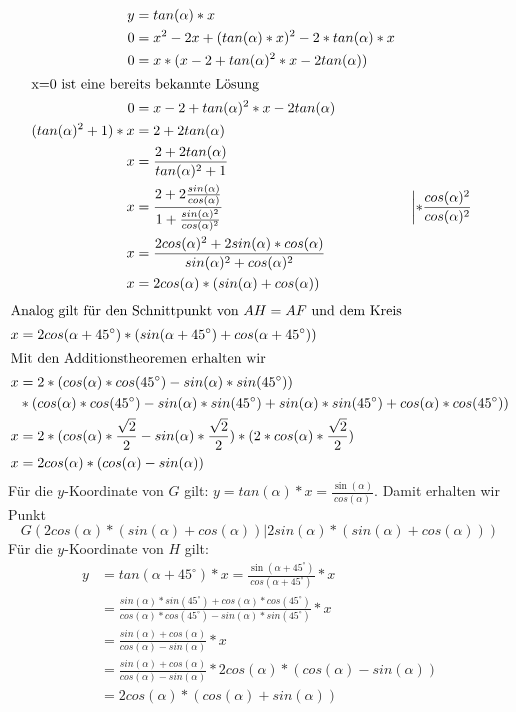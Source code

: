 \documentclass{article}
\numberwithin{equation}{section}
\begin{document}
	\begin{align*}
		y&=tan(\alpha)*x\\
		0&=x^2-2x+(tan(\alpha)*x)^2-2*tan(\alpha)*x\\
		0&=x*(x-2+tan(\alpha)^2*x-2tan(\alpha))\\
		\intertext{x=0 ist eine bereits bekannte Lösung}
		0&=x-2+tan(\alpha)^2*x-2tan(\alpha)\\
		(tan(\alpha)^2+1)*x&=2+2tan(\alpha)\\
		x&=\dfrac{2+2tan(\alpha)}{tan(\alpha)^2+1}\\
		x&=\dfrac{2+2\frac{sin(\alpha)}{cos(\alpha)}}{1+\frac{sin(\alpha)^2}{cos(\alpha)^2}}&&\left|*\frac{cos(\alpha)^2}{cos(\alpha)^2}\right.\\
		x&=\dfrac{2cos(\alpha)^2+2sin(\alpha)*cos(\alpha)}{sin(\alpha)^2+cos(\alpha)^2}\\
		x&=2cos(\alpha)*(sin(\alpha)+cos(\alpha))
	\end{align*}
	\begin{align*}
		\intertext{Analog gilt für den Schnittpunkt von $AH=AF$ und dem Kreis}
		x&=2cos(\alpha+45^{\circ})*(sin(\alpha+45^{\circ})+cos(\alpha+45^{\circ}))\\
		\intertext{Mit den Additionstheoremen erhalten wir}
		x&=2*(cos(\alpha)*cos(45^{\circ})-sin(\alpha)*sin(45^{\circ}))\\
		&*(cos(\alpha)*cos(45^{\circ})-sin(\alpha)*sin(45^{\circ})+sin(\alpha)*sin(45^{\circ})+cos(\alpha)*cos(45^{\circ}))\\
		x&=2*(cos(\alpha)*\frac{\sqrt{2}}{2}-sin(\alpha)*\frac{\sqrt{2}}{2})*(2*cos(\alpha)*\frac{\sqrt{2}}{2})\\
		x&=2cos(\alpha)*(cos(\alpha)-sin(\alpha))
	\end{align*}
	Für die $y$-Koordinate von $G$ gilt: $y = tan(\alpha)*x = \frac{\sin(\alpha)}{cos(\alpha)}$.
	Damit erhalten wir Punkt \[G\left(2cos(\alpha)*(sin(\alpha)+cos(\alpha))\left|2sin(\alpha)*(sin(\alpha)+cos(\alpha))\right.\right)\]
	Für die $y$-Koordinate von $H$ gilt:
	\begin{align*}
	y &= tan(\alpha+45^{\circ})*x = \frac{\sin(\alpha+45^{\circ})}{cos(\alpha+45^{\circ})}*x\\
	&= \frac{sin(\alpha)*sin(45^{\circ})+cos(\alpha)*cos(45^{\circ})}{cos(\alpha)*cos(45^{\circ})-sin(\alpha)*sin(45^{\circ})}*x\\ 
	&= \frac{sin(\alpha)+cos(\alpha)}{cos(\alpha)-sin(\alpha)}*x\\ 
	&= \frac{sin(\alpha)+cos(\alpha)}{cos(\alpha)-sin(\alpha)}*2cos(\alpha)*(cos(\alpha)-sin(\alpha)) \\
	&= 2cos(\alpha)*(cos(\alpha)+sin(\alpha))
	\end{align*}
\end{document}
